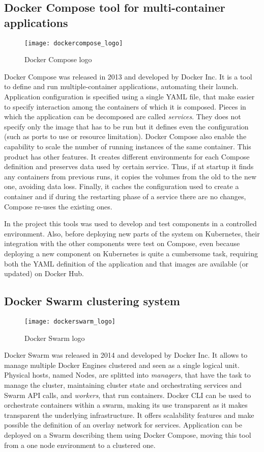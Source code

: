 \subsection{Docker Compose tool for multi-container applications}
\begin{figure}[t]
  \centering \texttt{[image: dockercompose\_logo]}
  \caption{Docker Compose logo}
  \label{chap:intro:img:docker_logo}
\end{figure}
Docker Compose was released in 2013 and developed by Docker Inc. It is a tool
to define and run multiple-container applications, automating their launch.
Application configuration is specified using a single YAML file, that make
easier to specify interaction among the containers of which it is composed.
Pieces in which the application can be decomposed are called
\emph{services}. They does not specify only the image that has to be run but
it defines even the configuration (such as ports to use or resource limitation).
Docker Compose also enable the capability to scale the number of running
instances of the same container. This product has other features. It creates
different environments for each Compose definition and preserves data used by 
certain service. Thus, if at startup it finds any containers from previous runs,
it copies the volumes from the old to the new one, avoiding data loss. Finally,
it caches the configuration used to create a container and if during
the restarting phase of a service there are no changes, Compose re-uses the
existing ones.

In the project this tools was used to develop and test components in a
controlled environment. Also, before deploying new parts of the system on
Kubernetes, their integration with the other components were test on Compose,
even because deploying a new component on Kubernetes is quite a cumbersome task,
requiring both the YAML definition of the application and that images are
available (or updated) on Docker Hub.

\subsection{Docker Swarm clustering system}
\begin{figure}[t]
  \centering \texttt{[image: dockerswarm\_logo]}
  \caption{Docker Swarm logo}
  \label{chap:intro:img:docker_logo}
\end{figure}
Docker Swarm was released in 2014 and developed by Docker Inc. It allows to
manage multiple Docker Engines clustered and seen as a single logical unit.
Physical hosts, named Nodes, are splitted into \emph{managers}, that have the
task to manage the cluster, maintaining cluster state and orchestrating services
and Swarm API calls, and \emph{workers}, that run containers. Docker CLI can
be used to orchestrate containers within a swarm, making its use transparent as
it makes transparent the underlying infrastructure. It offers scalability
features and make possible the definition of an overlay network for services.
Application can be deployed on a Swarm describing them using Docker Compose,
moving this tool from a one node environment to a clustered one.


